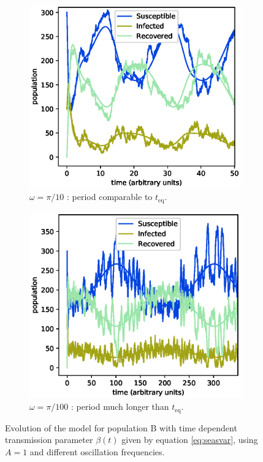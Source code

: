 \documentclass[a4paper,10pt,twocolumn]{article}
\begin{document}
\begin{figure}
	\centering
	\begin{subfigure}{0.5\textwidth}
		\centering
		\includegraphics[width=\linewidth]{BA1w0pi_1.eps}
		\caption{$\omega = \pi/10$ : period comparable to $t_\mathrm{eq}$.}
		\label{fig:dshort}
	\end{subfigure}%
	\begin{subfigure}{0.5\textwidth}
		\centering
		\includegraphics[width=\linewidth]{BA1w00pi_1.eps}
		\caption{$\omega = \pi/100$ : period much longer than $t_\mathrm{eq}$.}
		\label{fig:dlong}
	\end{subfigure}
	\caption{Evolution of the model for population B with time dependent transmission parameter $\beta(t)$ given by equation \ref{eq:seasvar}, using $A=1$ and different oscillation frequencies.}
	\label{fig:d}
\end{figure}
\end{document}
